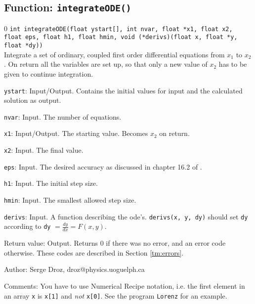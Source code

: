\subsection{Function: {\tt integrateODE()}}
\setcounter{equation}0
{\tt int integrateODE(float ystart[],  int nvar, float *x1, float x2, float eps, 
               float h1, float hmin, void (*derivs)(float x, float *y, float
			   *dy))}\\
Integrate a set of  ordinary, coupled first order differential equations from $x_1$ to $x_2$. 
On return all the variables are set up, so that only a new value of $x_2$
has to be given to continue integration.
\begin{description}
\item{{\tt ystart}}: Input/Output. Contains the initial values for input
and the calculated solution as output.
\item{{\tt nvar}}: Input. The number of equations.
\item{{\tt x1}}: Input/Output. The starting value. Becomes $x_2$ on return.
\item{{\tt x2}}: Input. The final value.
\item{{\tt eps}}: Input. The desired accuracy as discussed in chapter 16.2 of
\cite{NumRec}.
\item{{\tt h1}}: Input. The initial step size.
\item{{\tt hmin}}: Input. The smallest allowed step size.
\item{{\tt derivs}}: Input. A function describing the
  ode's. {\tt derivs(x, y, dy)} should set {\tt dy} according to 
  {\tt dy} $= \frac{dy}{dx}= F(x,y)$. 
\item{Return value}: Output. Returns $0$ if there was
   no error, and an error code otherwise. 
   These codes are described in Section \ref{tm:errors}.
\end{description}
\begin{description}
\item{Author:} Serge Droz, droz@physics.uoguelph.ca
\item{Comments:} You have to use Numerical Recipe
  notation, i.e. the first element in an array {\tt x} is 
  {\tt x[1]} and {\em not} {\tt x[0]}. See the program {\tt Lorenz}
  for an example. 
\end{description}
\clearpage   
%
%

